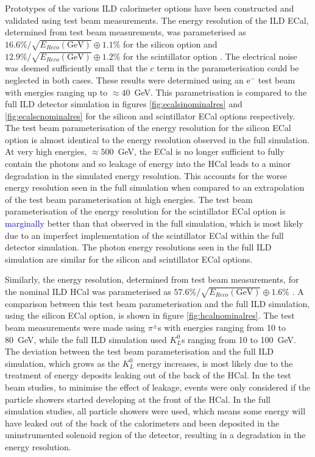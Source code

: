 Prototypes of the various ILD calorimeter options have been constructed and validated using test beam measurements.  The energy resolution of the ILD ECal, determined from test beam measurements, was parameterised as $16.6\% / \sqrt{E_{Reco}(\text{GeV})} \oplus 1.1 \%$ for the silicon option and $12.9 \% / \sqrt{E_{Reco}(\text{GeV})} \oplus 1.2 \%$ for the scintillator option \cite{Behnke:2013lya}.  The electrical noise was deemed sufficiently small that the $c$ term in the parameterisation could be neglected in both cases.  These results were determined using an $\text{e}^{-}$ test beam with energies ranging up to $\approx 40$~GeV.  This parametrisation is compared to the full ILD detector simulation in figures \ref{fig:ecalsinominalres} and \ref{fig:ecalscnominalres} for the silicon and scintillator ECal options respectively.  The test beam parameterisation of the energy resolution for the silicon ECal option is almost identical to the energy resolution observed in the full simulation.  At very high energies, $\approx 500$~GeV, the ECal is no longer sufficient to fully contain the photons and so leakage of energy into the HCal leads to a minor degradation in the simulated energy resolution.  This accounts for the worse energy resolution seen in the full simulation when compared to an extrapolation of the test beam parameterisation at high energies.  The test beam parameterisation of the energy resolution for the scintillator ECal option is \textcolor{blue}{marginally} better than that observed in the full simulation, which is most likely due to an imperfect implementation of the scintillator ECal within the full detector simulation.  The photon energy resolutions seen in the full ILD simulation are similar for the silicon and scintillator ECal options.      

Similarly, the energy resolution, determined from test beam measurements, for the nominal ILD HCal was parameterised as $57.6 \% / \sqrt{E_{Reco}(\text{GeV})} \oplus 1.6 \%$ \cite{Adloff:2012gv}.  A comparison between this test beam parameterisation and the full ILD simulation, using the silicon ECal option, is shown in figure \ref{fig:hcalnominalres}.  The test beam measurements were made using $\pi^{\pm}$s with energies ranging from 10 to 80~GeV, while the full ILD simulation used $K^{0}_{L}$s ranging from 10 to 100~GeV.  The deviation between the test beam parameterisation and the full ILD simulation, which grows as the $K^{0}_{L}$ energy increases, is most likely due to the treatment of energy deposits leaking out of the back of the HCal.  In the test beam studies, to minimise the effect of leakage, events were only considered if the particle showers started developing at the front of the HCal.  In the full simulation studies, all particle showers were used, which means some energy will have leaked out of the back of the calorimeters and been deposited in the uninstrumented solenoid region of the detector, resulting in a degradation in the energy resolution.   

